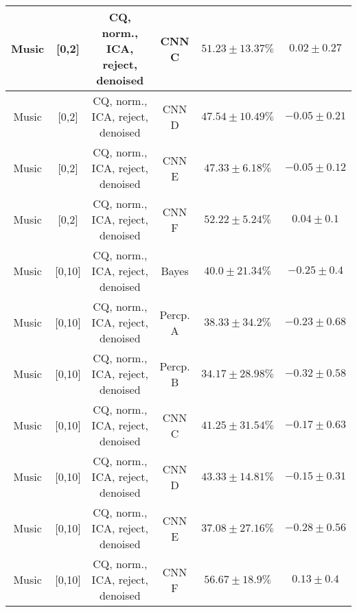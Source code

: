 \begin{table}[!htb]
{\begin{tabular}{c|c|c|c|c|c}
    \hline
    Music               & [0,2]                                         & \scriptsize{CQ, norm., ICA, reject, denoised}  & CNN C                 &  $51.23 \pm 13.37\%$  & $0.02 \pm 0.27$\\  
    \hline
    Music               & [0,2]                                         & \scriptsize{CQ, norm., ICA, reject, denoised}  & CNN D                 &  $47.54 \pm 10.49\%$  & $-0.05 \pm 0.21$\\ 
    \hline
    Music               & [0,2]                                         & \scriptsize{CQ, norm., ICA, reject, denoised}  & CNN E                 &  $47.33 \pm 6.18\%$   & $-0.05 \pm 0.12$\\ 
    \hline
    Music               & [0,2]                                         & \scriptsize{CQ, norm., ICA, reject, denoised}  & CNN F                 &  $52.22 \pm 5.24\%$   & $0.04 \pm 0.1$\\   
    \hline
    Music               & [0,10]                                        & \scriptsize{CQ, norm., ICA, reject, denoised}  & Bayes                 &  $40.0 \pm 21.34\%$   & $-0.25 \pm 0.4$\\  
    \hline
    Music               & [0,10]                                        & \scriptsize{CQ, norm., ICA, reject, denoised}  & Percp. A              &  $38.33 \pm 34.2\%$   & $-0.23 \pm 0.68$\\   
    \hline
    Music               & [0,10]                                        & \scriptsize{CQ, norm., ICA, reject, denoised}  & Percp. B              &  $34.17 \pm 28.98\%$  & $-0.32 \pm 0.58$\\   
    \hline
    Music               & [0,10]                                        & \scriptsize{CQ, norm., ICA, reject, denoised}  & CNN C                 &  $41.25 \pm 31.54\%$  & $-0.17 \pm 0.63$\\   
    \hline
    Music               & [0,10]                                        & \scriptsize{CQ, norm., ICA, reject, denoised}  & CNN D                 &  $43.33 \pm 14.81\%$  & $-0.15 \pm 0.31$\\   
    \hline
    Music               & [0,10]                                        & \scriptsize{CQ, norm., ICA, reject, denoised}  & CNN E                 &  $37.08 \pm 27.16\%$  & $-0.28 \pm 0.56$\\  
    \hline
    Music               & [0,10]                                        & \scriptsize{CQ, norm., ICA, reject, denoised}  & CNN F                 &  $56.67 \pm 18.9\%$   & $0.13 \pm 0.4$\\   

\end{tabular}}
\end{table}
